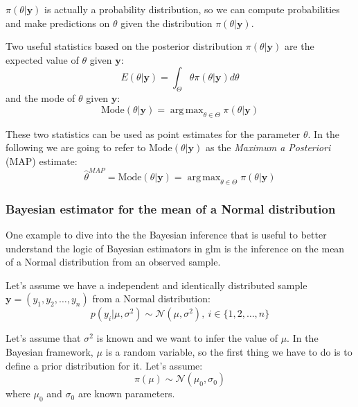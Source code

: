 \documentclass[a4paper, twoside, openright, 12pt]{report}
\DeclareMathOperator*{\argmax}{arg\,max}  %
\theoremstyle{definition}
\theoremstyle{definition}
\theoremstyle{definition}
\theoremstyle{remark}
\begin{document}
\(\pi(\theta|\boldsymbol{y})\) is actually a probability distribution, so we can compute probabilities and make predictions on \(\theta\) given the distribution \(\pi(\theta|\boldsymbol{y})\).

Two useful statistics based on the posterior distribution \(\pi(\theta|\boldsymbol{y})\) are the expected value of \(\theta\) given \(\boldsymbol{y}\):
\[
E(\theta|\boldsymbol{y}) = \int_{\Theta}{\theta \pi(\theta|\boldsymbol{y}) d\theta}
\]
and the mode of \(\theta\) given \(\boldsymbol{y}\):
\[
\text{Mode}(\theta|\boldsymbol{y}) = \argmax_{\theta\in\Theta}{\pi(\theta|\boldsymbol{y})}
\]

These two statistics can be used as point estimates for the parameter \(\theta\). In the following we are going to refer to \(\text{Mode}(\theta|\boldsymbol{y})\) as the \emph{Maximum a Posteriori} (MAP) estimate:
\[
\hat{\theta}^{MAP} = \text{Mode}(\theta|\boldsymbol{y}) = \argmax_{\theta\in\Theta}{\pi(\theta|\boldsymbol{y})}
\]

\hypertarget{bayesian-estimator-for-the-mean-of-a-normal-distribution}{%
\subsubsection{Bayesian estimator for the mean of a Normal distribution}\label{bayesian-estimator-for-the-mean-of-a-normal-distribution}}

One example to dive into the the Bayesian inference that is useful to better understand the logic of Bayesian estimators in \ac{glm} is the inference on the mean of a Normal distribution from an observed sample.

Let's assume we have a independent and identically distributed sample \(\boldsymbol{y} = (y_1, y_2, \dots, y_n)\) from a Normal distribution:
\begin{equation}
\label{eq:bayes-normal-normal-likelihood}
p(y_i | \mu, \sigma^2) \sim \mathcal{N}(\mu, \sigma^2), \ i\in\{1,2,\dots,n\}
\end{equation}

Let's assume that \(\sigma^2\) is known and we want to infer the value of \(\mu\). In the Bayesian framework, \(\mu\) is a random variable, so the first thing we have to do is to define a prior distribution for it. Let's assume:
\begin{equation}
\label{eq:bayes-normal-normal-prior}
\pi(\mu) \sim \mathcal{N}(\mu_0, \sigma_0)
\end{equation}
where \(\mu_0\) and \(\sigma_0\) are known parameters.
\end{document}
